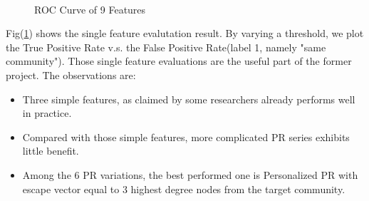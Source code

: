 \documentclass[11pt,a4paper]{article}
\begin{document}
\begin{figure}[htb]
\begin{center}
        \\%
%
    \end{center}
    \caption{%
        ROC Curve of 9 Features
     }%
     \label{fig:old_roc_sub_all}
\end{figure}

Fig(\ref{fig:old_roc_sub_all}) shows the single feature evalutation result. 
By varying a threshold, we plot the True Positive Rate v.s. the False Positive 
Rate(label 1, namely "same community"). Those single feature evaluations 
are the useful part of the former project. The observations are:
\begin{itemize}
	\item Three simple features, as claimed by some researchers already 
	performs well in practice. 
	\item Compared with those simple features, more complicated PR
	series exhibits little benefit. 
	\item Among the 6 PR variations, the best performed one is Personalized
	PR with escape vector equal to 3 highest degree nodes from the target 
	community. 
\end{itemize}
\end{document}

